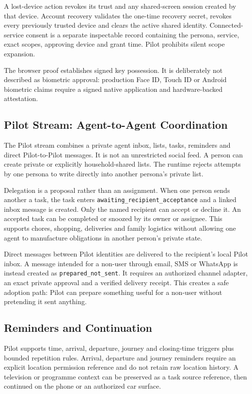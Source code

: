 A lost-device action revokes its trust and any shared-screen session created by that
device. Account recovery validates the one-time recovery secret, revokes every previously
trusted device and clears the active shared identity. Connected-service consent is a
separate inspectable record containing the persona, service, exact scopes, approving
device and grant time. Pilot prohibits silent scope expansion.

The browser proof establishes signed key possession. It is deliberately not described as
biometric approval: production Face ID, Touch ID or Android biometric claims require a
signed native application and hardware-backed attestation.

\subsection{Pilot Stream: Agent-to-Agent Coordination}

The Pilot stream combines a private agent inbox, lists, tasks, reminders and direct
Pilot-to-Pilot messages. It is not an unrestricted social feed. A person can create private
or explicitly household-shared lists. The runtime rejects attempts by one persona to
write directly into another persona's private list.

Delegation is a proposal rather than an assignment. When one person sends another a task,
the task enters \texttt{awaiting\_recipient\_acceptance} and a linked inbox message is
created. Only the named recipient can accept or decline it. An accepted task can be
completed or snoozed by its owner or assignee. This supports chores, shopping, deliveries
and family logistics without allowing one agent to manufacture obligations in another
person's private state.

Direct messages between Pilot identities are delivered to the recipient's local Pilot
inbox. A message intended for a non-user through email, SMS or WhatsApp is instead created
as \texttt{prepared\_not\_sent}. It requires an authorized channel adapter, an exact
private approval and a verified delivery receipt. This creates a safe adoption path: Pilot
can prepare something useful for a non-user without pretending it sent anything.

\subsection{Reminders and Continuation}

Pilot supports time, arrival, departure, journey and closing-time triggers plus bounded
repetition rules. Arrival, departure and journey reminders require an explicit location
permission reference and do not retain raw location history. A television or programme
context can be preserved as a task source reference, then continued on the phone or an
authorized car surface.

